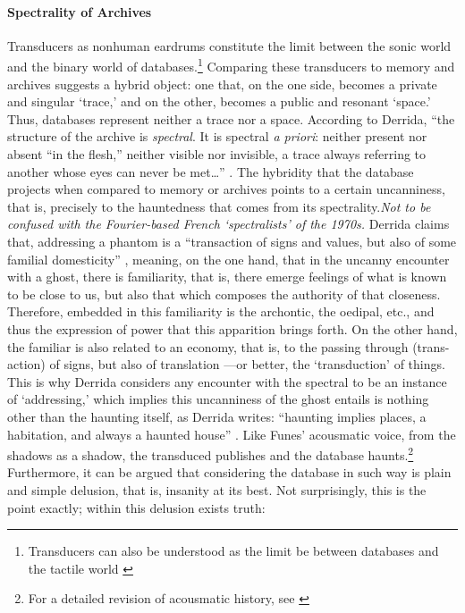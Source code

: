 \paragraph{Spectrality of Archives}
Transducers as nonhuman eardrums constitute the limit between the sonic world and the binary world of databases.\footnote{Transducers can also be understood as the limit be between databases and the tactile world \parencite[223]{Eck13:Bet}} Comparing these transducers to memory and archives suggests a hybrid object: one that, on the one side, becomes a private and singular `trace,' and on the other, becomes a public and resonant `space.' Thus, databases represent neither a trace nor a space. According to Derrida, ``the structure of the archive is \textit{spectral}. It is spectral \textit{a priori}: neither present nor absent ``in the flesh,'' neither visible nor invisible, a trace always referring to another whose eyes can never be met\dots'' \parencite[54]{Der95:Arc}. The hybridity that the database projects when compared to memory or archives points to a certain uncanniness, that is, precisely to the hauntedness that comes from its spectrality.\textit{Not to be confused with the Fourier-based French `spectralists' of the 1970s.} Derrida claims that, addressing a phantom is a ``transaction of signs and values, but also of some familial domesticity'' \parencite[55]{Der95:Arc}, meaning, on the one hand, that in the uncanny encounter with a ghost, there is familiarity, that is, there emerge feelings of what is known to be close to us, but also that which composes the authority of that closeness. Therefore, embedded in this familiarity is the archontic, the oedipal, etc., and thus the expression of power that this apparition brings forth. On the other hand, the familiar is also related to an economy, that is, to the passing through (trans-action) of signs, but also of translation ---or better, the `transduction' of things. This is why Derrida considers any encounter with the spectral to be an instance of `addressing,' which implies this uncanniness of the ghost entails is nothing other than the haunting itself, as Derrida writes: ``haunting implies places, a habitation, and always a haunted house'' \parencite[55]{Der95:Arc}. Like Funes' acousmatic voice, from the shadows as a shadow, the transduced publishes and the database haunts.\footnote{For a detailed revision of acousmatic history, see \textcite{Kan14:Sou}} Furthermore, it can be argued that considering the database in such way is plain and simple delusion, that is, insanity at its best. Not surprisingly, this is the point exactly; within this delusion exists truth:

